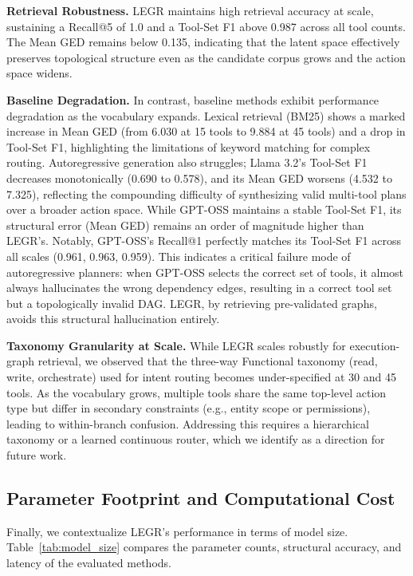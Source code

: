 \documentclass{article}
\begin{document}
\textbf{Retrieval Robustness.} LEGR maintains high retrieval accuracy at scale, sustaining a Recall@5 of 1.0 and a Tool-Set F1 above 0.987 across all tool counts. The Mean GED remains below 0.135, indicating that the latent space effectively preserves topological structure even as the candidate corpus grows and the action space widens.

\textbf{Baseline Degradation.} In contrast, baseline methods exhibit performance degradation as the vocabulary expands. Lexical retrieval (BM25) shows a marked increase in Mean GED (from 6.030 at 15 tools to 9.884 at 45 tools) and a drop in Tool-Set F1, highlighting the limitations of keyword matching for complex routing. Autoregressive generation also struggles; Llama 3.2's Tool-Set F1 decreases monotonically (0.690 to 0.578), and its Mean GED worsens (4.532 to 7.325), reflecting the compounding difficulty of synthesizing valid multi-tool plans over a broader action space. While GPT-OSS maintains a stable Tool-Set F1, its structural error (Mean GED) remains an order of magnitude higher than LEGR's. Notably, GPT-OSS's Recall@1 perfectly matches its Tool-Set F1 across all scales (0.961, 0.963, 0.959). This indicates a critical failure mode of autoregressive planners: when GPT-OSS selects the correct set of tools, it almost always hallucinates the wrong dependency edges, resulting in a correct tool set but a topologically invalid DAG. LEGR, by retrieving pre-validated graphs, avoids this structural hallucination entirely.

\textbf{Taxonomy Granularity at Scale.} While LEGR scales robustly for execution-graph retrieval, we observed that the three-way Functional taxonomy (read, write, orchestrate) used for intent routing becomes under-specified at 30 and 45 tools. As the vocabulary grows, multiple tools share the same top-level action type but differ in secondary constraints (e.g., entity scope or permissions), leading to within-branch confusion. Addressing this requires a hierarchical taxonomy or a learned continuous router, which we identify as a direction for future work.

\subsection{Parameter Footprint and Computational Cost}
Finally, we contextualize LEGR's performance in terms of model size. Table~\ref{tab:model_size} compares the parameter counts, structural accuracy, and latency of the evaluated methods.
\end{document}
